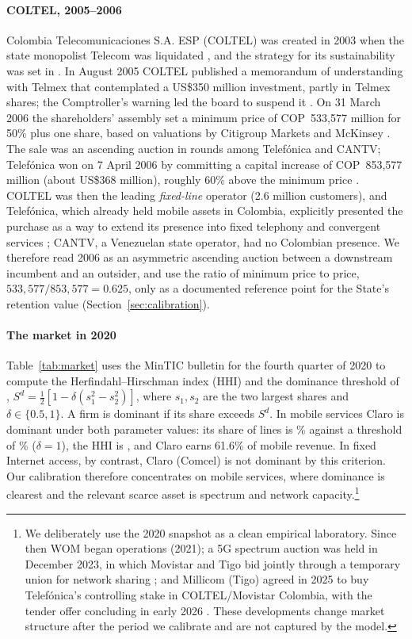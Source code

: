 \documentclass[12pt,a4paper]{article}
\theoremstyle{definition}
\theoremstyle{remark}
\newcommand{\us}{US\$}
\begin{document}
\paragraph{COLTEL, 2005--2006} Colombia Telecomunicaciones S.A. ESP (COLTEL) was created in 2003 when the state monopolist Telecom was liquidated \citep{decreto1616}, and the strategy for its sustainability was set in \citet{conpes3374}. In August 2005 COLTEL published a memorandum of understanding with Telmex that contemplated a US\$350 million investment, partly in Telmex shares; the Comptroller's warning led the board to suspend it \citep{razonpublica}. On 31 March 2006 the shareholders' assembly set a minimum price of COP~533,577 million for 50\% plus one share, based on valuations by Citigroup Markets and McKinsey \citep{razonpublica,infobae2006}. The sale was an ascending auction in rounds among Telef\'onica and CANTV; Telef\'onica won on 7 April 2006 by committing a capital increase of COP~853,577 million (about \us368 million), roughly 60\% above the minimum price \citep{telefonica2006,infobae2006}. COLTEL was then the leading \emph{fixed-line} operator (2.6 million customers), and Telef\'onica, which already held mobile assets in Colombia, explicitly presented the purchase as a way to extend its presence into fixed telephony and convergent services \citep{telefonica2006}; CANTV, a Venezuelan state operator, had no Colombian presence. We therefore read 2006 as an asymmetric ascending auction between a downstream incumbent and an outsider, and use the ratio of minimum price to price, $533{,}577/853{,}577=0.625$, only as a documented reference point for the State's retention value (Section~\ref{sec:calibration}).

\paragraph{The market in 2020} Table~\ref{tab:market} uses the MinTIC bulletin for the fourth quarter of 2020 \citep{mintic2021} to compute the Herfindahl--Hirschman index (HHI) and the dominance threshold of \citet{melnik2008}, $S^d=\tfrac12[1-\delta(s_1^2-s_2^2)]$, where $s_1,s_2$ are the two largest shares and $\delta\in\{0.5,1\}$. A firm is dominant if its share exceeds $S^d$. In mobile services Claro is dominant under both parameter values: its share of lines is \claroShare\% against a threshold of \claroThreshold\% ($\delta=1$), the HHI is \hhiMobile, and Claro earns 61.6\% of mobile revenue. In fixed Internet access, by contrast, Claro (Comcel) is not dominant by this criterion. Our calibration therefore concentrates on mobile services, where dominance is clearest and the relevant scarce asset is spectrum and network capacity.\footnote{We deliberately use the 2020 snapshot as a clean empirical laboratory. Since then WOM began operations (2021); a 5G spectrum auction was held in December 2023, in which Movistar and Tigo bid jointly through a temporary union for network sharing \citep{rcr2023}; and Millicom (Tigo) agreed in 2025 to buy Telef\'onica's controlling stake in COLTEL/Movistar Colombia, with the tender offer concluding in early 2026 \citep{millicom2026}. These developments change market structure after the period we calibrate and are not captured by the model.}
\end{document}
